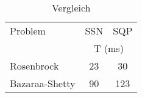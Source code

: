 
\begin{table}
\centering
\begin{tabular*}{0.5\linewidth}{@{\extracolsep{\fill}}lcc}
  \toprule
  Problem &   SSN   &   SQP   \\
  \cmidrule{2-3}
          & \multicolumn{2}{c}{T (ms)} \\
  \midrule
  Rosenbrock     &  23  &  30  \\
  Bazaraa-Shetty &  90  & 123  \\
  \bottomrule
\end{tabular*}
\caption{Vergleich}
\end{table}

